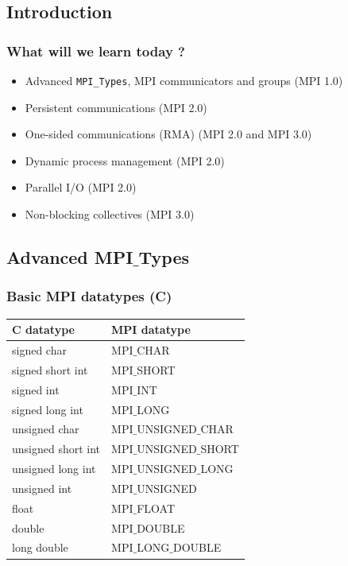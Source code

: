 \subsection{Introduction}

\begin{frame}[containsverbatim]
	\frametitle{What will we learn today ?}	
	\begin{itemize}
		\item {Advanced \verb+MPI_Types+, MPI communicators and groups (MPI 1.0)}
		\item {Persistent communications (MPI 2.0)}
		\item {One-sided communications (RMA) (MPI 2.0 and MPI 3.0)}
		\item {Dynamic process management (MPI 2.0)}
		\item {Parallel I/O (MPI 2.0)}
		\item {Non-blocking collectives (MPI 3.0)}
	\end{itemize}
\end{frame}


\subsection{Advanced MPI$\_$Types}


\begin{frame}[containsverbatim]
\frametitle{Basic MPI datatypes (C)}

\begin{center}
\begin{tabular}{ | l | l | }
	\hline 
	\textbf{C datatype} & \textbf{MPI datatype} \\
	\hline 
	\hline 
	signed char & MPI$\_$CHAR\\
	signed short int & MPI$\_$SHORT\\
	signed int & MPI$\_$INT \\
	signed long int & MPI$\_$LONG \\
	unsigned char & MPI$\_$UNSIGNED$\_$CHAR\\
	unsigned short int & MPI$\_$UNSIGNED$\_$SHORT\\
	unsigned long int & MPI$\_$UNSIGNED$\_$LONG\\
	unsigned int & MPI$\_$UNSIGNED\\
	float & MPI$\_$FLOAT\\
	double & MPI$\_$DOUBLE\\
	long double & MPI$\_$LONG$\_$DOUBLE\\
	\hline 
 \end{tabular}
\end{center}
\end{frame}


